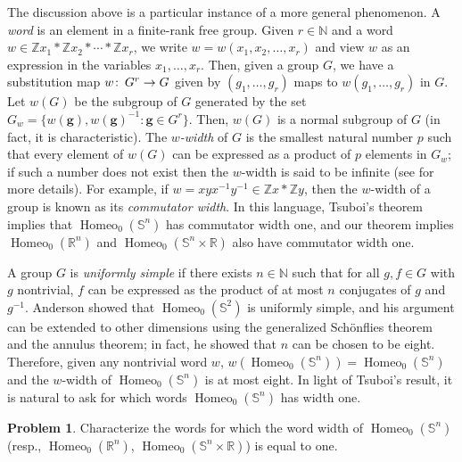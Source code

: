 \documentclass[microtype]{gtpart}
\newcommand{\br}{\mathbb{R}}
\newcommand{\bz}{\mathbb Z}
\newcommand{\bn}{\mathbb N}
\DeclareMathOperator{\Homeo}{Homeo}
\renewcommand{\co}{\colon\thinspace}
\theoremstyle{definition}
\newtheorem*{Problem}{Problem}
\numberwithin{equation}{section}
\begin{document}
The discussion above is a particular instance of a more general phenomenon.
A \emph{word} is an element in a finite-rank free group.
Given \( r \in \bn \) and a word \( {w \in \bz x_1 * \bz x_2 *\cdots*\bz x_r} \), we write \( w = w(x_1, x_2, \ldots, x_r) \) and view \( w \) as an expression in the variables \( x_1, \ldots, x_r \).
Then, given a group \( G \), we have a substitution map \( w \co G^r \to G \) given by \( (g_1, \ldots, g_r) \) maps to \( w(g_1, \ldots, g_r) \) in \( G \). 
Let \( w(G) \) be the subgroup of \( G \) generated by the set \( {G_w = \{ w(\mathbf g), w(\mathbf g)^{-1} : \mathbf g \in G^r \}} \).
Then, \( w(G) \) is a normal subgroup of \( G \) (in fact, it is characteristic).
The \emph{\( w \)-width} of \( G \) is the smallest natural number \( p \) such that every element of \( w(G) \) can be expressed as a product of \( p \) elements in \( G_w \); if such a number does not exist then the \( w \)-width is said to be infinite (see \cite{SegalWords} for more details). 
For example, if \( w = xyx^{-1}y^{-1} \in \bz x * \bz y \), then the \( w \)-width of a group is known as its \emph{commutator width}. 
In this language, Tsuboi's theorem implies that \( \Homeo_0(\mathbb S^n) \) has commutator width one, and our theorem implies   \( \Homeo_0(\br^n) \) and \( \Homeo_0(\mathbb S^n \times \br ) \) also have commutator width one. 

A group \( G \) is \emph{uniformly simple} if there exists \( n \in \bn \) such that for all \( g, f \in G \) with \( g \) nontrivial, \( f \) can be expressed as the product of at most \( n \) conjugates of \( g \) and \( g^{-1} \).
Anderson \cite{AndersonAlgebraic} showed that \( \Homeo_0(\mathbb S^2) \) is uniformly simple, and his argument can be extended to other dimensions using the generalized Sch\"onflies theorem and the annulus theorem; in fact, he showed that \( n \) can be chosen to be eight.
Therefore, given any nontrivial word \( w \), \( w(\Homeo_0(\mathbb S^n)) = \Homeo_0(\mathbb S^n) \) and the \( w \)-width of \( \Homeo_0(\mathbb S^n) \) is at most eight. 
In light of Tsuboi's result, it is natural to ask for which words \( \Homeo_0(\mathbb S^n) \) has width one. 

\begin{Problem}
Characterize the words for which the word width of \( \Homeo_0(\mathbb S^n) \) (resp., \( \Homeo_0(\br^n) \), \( \Homeo_0(\mathbb S^n \times \br) \)) is equal to one. 
\end{Problem}

\end{document}
